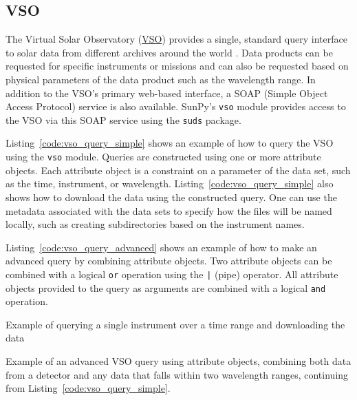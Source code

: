 \subsection{VSO}\label{ssec:vso}

The Virtual Solar Observatory (\href{http://virtualsolar.org}{VSO}) provides a 
single, standard query interface to solar data from different archives 
around the world \citep{hill2009}.
Data products can be requested for specific instruments or missions and
can also be requested based on physical parameters of the data product such
as the wavelength range.
In addition to the VSO's primary web-based interface, a SOAP (Simple Object 
Access Protocol) service is also available.
SunPy's \texttt{vso} module provides access to the VSO via this SOAP service using the
\texttt{suds} package.

Listing~\ref{code:vso_query_simple} shows an example of how to query the VSO
using the \texttt{vso} module.
Queries are constructed using one or more attribute objects. Each
attribute object is a constraint on a parameter of the data set, such as the
time, instrument, or wavelength.
Listing~\ref{code:vso_query_simple} also shows how to download the data using
the constructed query. One can use the metadata associated with the data sets to 
specify how the files will be named locally, such as creating subdirectories 
based on the instrument names.

Listing~\ref{code:vso_query_advanced} shows an example of how to make an advanced
query by combining attribute objects.
Two attribute objects can be combined with a logical \texttt{or} operation
using the \texttt{|} (pipe) operator.
All attribute objects provided to the query as arguments are combined with a 
logical \texttt{and} operation.

\begin{listing}[H]
\caption{Example of querying a single instrument over a time range and downloading the data}
\label{code:vso_query_simple}
\end{listing}

\begin{listing}[H]
\caption{Example of an advanced VSO query using attribute objects,
combining both data from a detector and any data that falls within two wavelength ranges,
continuing from Listing~\ref{code:vso_query_simple}.}
\label{code:vso_query_advanced}
\end{listing}
